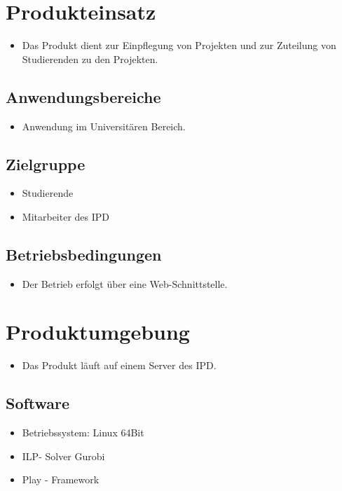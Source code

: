\documentclass[parskip=full]{scrartcl}
\begin{document}
\section{Produkteinsatz}
\begin{itemize}
  \item Das Produkt dient zur Einpflegung von Projekten und zur Zuteilung von
Studierenden zu den Projekten.
\end{itemize}

\subsection{Anwendungsbereiche}

\begin{itemize} 
  \item Anwendung im Universitären Bereich. 
\end{itemize}

\subsection{Zielgruppe}
\begin{itemize} 
  \item Studierende 
  \item Mitarbeiter des IPD 
\end{itemize}

\subsection{Betriebsbedingungen}
\begin{itemize} 
  \item Der Betrieb erfolgt über eine Web-Schnittstelle.
\end{itemize}
\section{Produktumgebung}
\begin{itemize} 
  \item Das Produkt läuft auf einem Server des IPD.
\end{itemize}
\subsection{Software}
\begin{itemize} 
  \item Betriebssystem: Linux 64Bit
  \item ILP- Solver Gurobi
  \item Play - Framework
\end{itemize}
\end{document}
